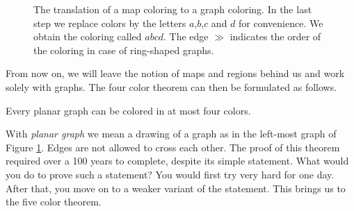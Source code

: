 \begin{figure}[!h]
    \caption{The translation of a map coloring to a graph coloring. In the last step we replace colors by the letters $a$,$b$,$c$ and $d$ for convenience. We obtain the coloring called $abcd$. The edge $\gg$ indicates the order of the coloring in case of ring-shaped graphs. }
    \label{fig:colortut}
\end{figure}

From now on, we will leave the notion of maps and regions behind us and work solely with graphs. The four color theorem can then be formulated as follows.

\begin{theorem}
    Every planar graph can be colored in at most four colors.
\end{theorem}

With \textit{planar graph} we mean a drawing of a graph as in the left-most graph of Figure \ref{fig:colortut}. Edges are not allowed to cross each other. The proof of this theorem required over a 100 years to complete, despite its simple statement. What would you do to prove such a statement? You would first try very hard for one day. After that, you move on to a weaker variant of the statement. This brings us to the five color theorem.